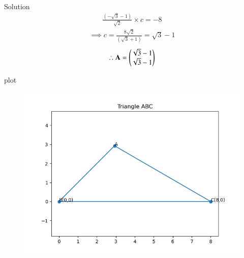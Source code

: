 \documentclass{beamer}
\begin{document}
\begin{frame}{Solution}
\begin{align}
    \frac{(-\sqrt{3}-1)}{\sqrt{2}} \times c = -8
    \end{align}
    \begin{align}
        \implies c = \frac{8\sqrt{2}}{(\sqrt{3}+1)} = \sqrt{3}-1
    \end{align}
    \begin{align}
        \therefore \mathbf{A}=\begin{pmatrix}\sqrt{3}-1 \\ 
        \sqrt{3}-1\end{pmatrix}
    \end{align}
\end{frame}
\begin{frame}{plot}
    \begin{figure}[H]
    \centering
    \includegraphics[width=0.6\columnwidth]{../figs/fig.png}   
    \label{fig-1}
\end{figure}
\end{frame}
\end{document}
